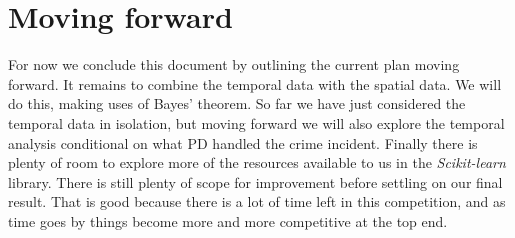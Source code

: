\documentclass[12pt,notitlepage]{article}
\begin{document}
\section{Moving forward}

For now we conclude this document by outlining the current plan moving forward. It remains to combine the temporal data with the spatial data. We will do this, making uses of Bayes' theorem. So far we have just considered the temporal data in isolation, but moving forward we will also explore the temporal analysis conditional on what PD handled the crime incident. Finally there is plenty of room to explore more of the resources available to us in the \emph{Scikit-learn} library. There is still plenty of scope for improvement before settling on our final result. That is good because there is a lot of time left in this competition, and as time goes by things become more and more competitive at the top end.

\end{document}
